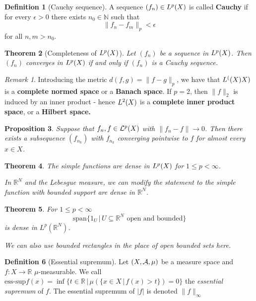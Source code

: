 \documentclass[10pt, oneside, reqno]{amsart}
\theoremstyle{plain}%
\newtheorem{thm}{Theorem}[section]
\newtheorem{prop}[thm]{Proposition}
\theoremstyle{definition}
\newtheorem{defn}[thm]{Definition}
\theoremstyle{remark}
\newtheorem*{rem}{Remark}
\newcommand{\R}{\mathbb{R}}
\begin{document}
\begin{defn}[Cauchy sequence]
	A sequence $(f_n) \in L^{p}(X)$ is called \textbf{Cauchy} if for every $\epsilon > 0$ there exists $n_0 \in \mathbb{N}$ such that \[
		\| f_n - f_m \|_p < \epsilon
	\] for all $n,m > n_0$.
\end{defn}

\begin{thm}[Completeness of $L^{p}(X)$]
	Let $(f_n)$ be a sequence in $L^{p}(X)$.  Then $(f_n)$ converges in $L^{p}(X)$ if and only if $(f_n)$ is a Cauchy sequence.
\end{thm}

\begin{rem}
	Introducing the metric $d(f,g) = \|f-g\|_p$, we have that $L^{(}(X)X)$ is a \textbf{complete normed space} or a \textbf{Banach space}. If $p = 2$, then $\|f \|_2 $ is induced by an inner product - hence $L^{2}(X)$ is a \textbf{complete inner product space}, or a \textbf{Hilbert space.}
\end{rem}


\begin{prop}
	Suppose that $f_n, f \in \mathcal{L}^{p}(X)$ with $\|f_n - f \| \rightarrow 0$. Then there exists a subsequence $(f_{n_k})$ with $f_{n_k}$ converging pointwise to $f$ for almost every $x \in X$.
\end{prop}


\begin{thm}
	The simple functions are dense in $L^{p}(X)$ for $1 \leq p < \infty$.
	
	In $\R^N$ and the Lebesgue measure, we can modify the statement to the simple function with bounded support are dense in $\R^N$. 
\end{thm}


\begin{thm}
	For $1 \leq p < \infty$
	\[
		\text{span} \{1_U \, | \, U \subseteq \R^N \text{ open and bounded} \}
	\] is dense in $L^p(\R^N)$.  
	
	We can also use bounded rectangles in the place of open bounded sets here.
\end{thm}

\begin{defn}[Essential supremum]
	Let $(X, \mathcal{A}, \mu)$ be a measure space and $f : X \rightarrow \R$ $\mu$-measurable.  We call $\text{ess-sup} f(x) = \inf \{ t \in \R \, | \, \mu(\{ x \in X \, | \, f(x) > t \} ) = 0 \}$ the \emph{essential supremum} of $f$.  The essential supremum of $|f|$ is denoted $\| f \|_\infty$
\end{defn}
\end{document}
